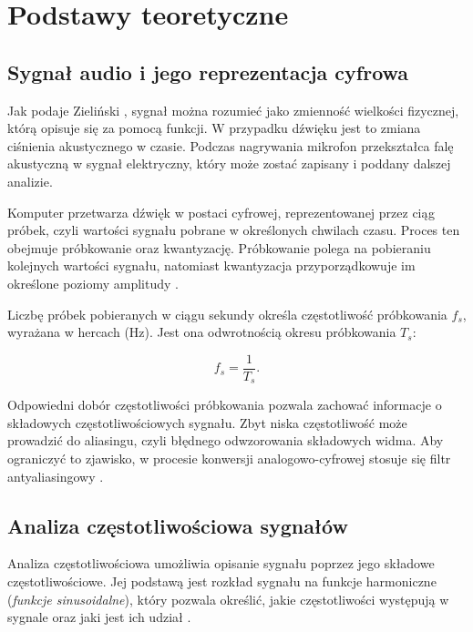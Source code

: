 \documentclass[12pt, a4paper]{article}
\theoremstyle{definition}
\theoremstyle{plain}
\theoremstyle{remark}
\begin{document}
\section{Podstawy teoretyczne}

\subsection{Sygnał audio i jego reprezentacja cyfrowa}


Jak podaje Zieliński \cite{zielinski2005}, sygnał można rozumieć jako zmienność wielkości fizycznej, którą opisuje się za pomocą funkcji. W przypadku dźwięku jest to zmiana ciśnienia akustycznego w czasie. Podczas nagrywania mikrofon przekształca falę akustyczną w sygnał elektryczny, który może zostać zapisany i poddany dalszej analizie.

Komputer przetwarza dźwięk w postaci cyfrowej, reprezentowanej przez ciąg próbek, czyli wartości sygnału pobrane w określonych chwilach czasu. Proces ten obejmuje próbkowanie oraz kwantyzację. Próbkowanie polega na pobieraniu kolejnych wartości sygnału, natomiast kwantyzacja przyporządkowuje im określone poziomy amplitudy \cite{zielinski2005,oppenheim2010}.

Liczbę próbek pobieranych w ciągu sekundy określa częstotliwość próbkowania $f_s$, wyrażana w hercach (Hz). Jest ona odwrotnością okresu próbkowania $T_s$:

\begin{equation}
    f_s = \frac{1}{T_s}.
\end{equation}

Odpowiedni dobór częstotliwości próbkowania pozwala zachować informacje o składowych częstotliwościowych sygnału. Zbyt niska częstotliwość może prowadzić do aliasingu, czyli błędnego odwzorowania składowych widma. Aby ograniczyć to zjawisko, w procesie konwersji analogowo-cyfrowej stosuje się filtr antyaliasingowy \cite{zielinski2005, oppenheim2010}.

\subsection{Analiza częstotliwościowa sygnałów}

Analiza częstotliwościowa umożliwia opisanie sygnału poprzez jego składowe częstotliwościowe. Jej podstawą jest rozkład sygnału na funkcje harmoniczne (\textit{funkcje sinusoidalne}), który pozwala określić, jakie częstotliwości występują w sygnale oraz jaki jest ich udział \cite{zielinski2005,oppenheim2010}.
\end{document}

